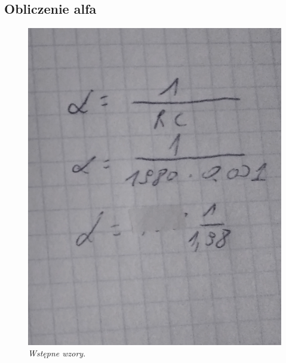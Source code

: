 \documentclass[12pt,oneside,a4paper]{book} %
\begin{document}




\subsection{Obliczenie alfa}

\begin{figure}[h]
\begin{center} 

\includegraphics[scale=0.7]{./images/02.PNG}

\caption{\textit{Wstępne wzory}.\newline }
\label{rys:logoup}
\end{center}
\end{figure}
\end{document}

